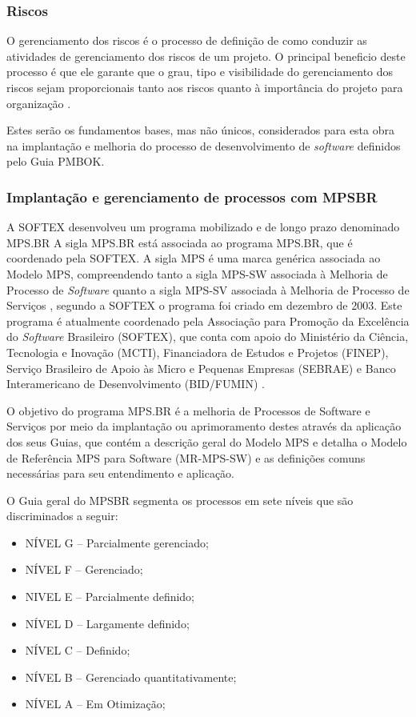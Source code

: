 \documentclass{acm_proc_article-sp}
\begin{document}
\subsubsection*{Riscos}
O gerenciamento dos riscos é o processo de definição de como conduzir as atividades de gerenciamento dos riscos de um projeto. O principal beneficio deste processo é que ele garante que o grau, tipo e visibilidade do gerenciamento dos riscos sejam proporcionais tanto aos riscos quanto à importância do projeto para organização \cite{pmbok:nAgil}.


Estes serão os fundamentos bases, mas não únicos, considerados para esta obra na implantação e melhoria do processo de desenvolvimento de \textit{software} definidos pelo Guia PMBOK. 

\subsubsection{Implantação e gerenciamento de processos com MPSBR}
A SOFTEX desenvolveu um programa mobilizado e de longo prazo denominado MPS.BR  A sigla
MPS.BR está associada ao programa MPS.BR, que é coordenado pela SOFTEX. A sigla MPS é uma
marca genérica associada ao Modelo MPS, compreendendo tanto a sigla MPS-SW associada à
Melhoria de Processo de \textit{Software} quanto a sigla MPS-SV associada à Melhoria de Processo de
Serviços \cite{mpsbr:nAgil}, segundo a SOFTEX o programa foi criado em dezembro de 2003. Este programa é atualmente coordenado pela Associação para Promoção da Excelência do \textit{Software} Brasileiro (SOFTEX), que conta com apoio do Ministério da Ciência, Tecnologia e Inovação (MCTI), Financiadora de Estudos e Projetos (FINEP), Serviço Brasileiro de Apoio às Micro e Pequenas Empresas (SEBRAE) e Banco Interamericano de Desenvolvimento (BID/FUMIN) \cite{mpsbr:nAgil}.

O objetivo do programa MPS.BR é a melhoria de Processos de Software e Serviços por meio da implantação ou aprimoramento destes através da aplicação dos seus Guias, que contém a descrição geral do Modelo MPS e detalha o Modelo
de Referência MPS para Software (MR-MPS-SW) e as definições comuns necessárias para seu entendimento e aplicação. 

O Guia geral do MPSBR segmenta os processos em sete níveis que são discriminados a seguir:

\begin{itemize}
\item NÍVEL G – Parcialmente gerenciado;
\item NÍVEL F – Gerenciado;
\item NIVEL E – Parcialmente definido;
\item NÍVEL D – Largamente definido;
\item NÍVEL C – Definido;
\item NÍVEL B – Gerenciado quantitativamente;
\item NÍVEL A – Em Otimização;
\end{itemize}
\end{document}
